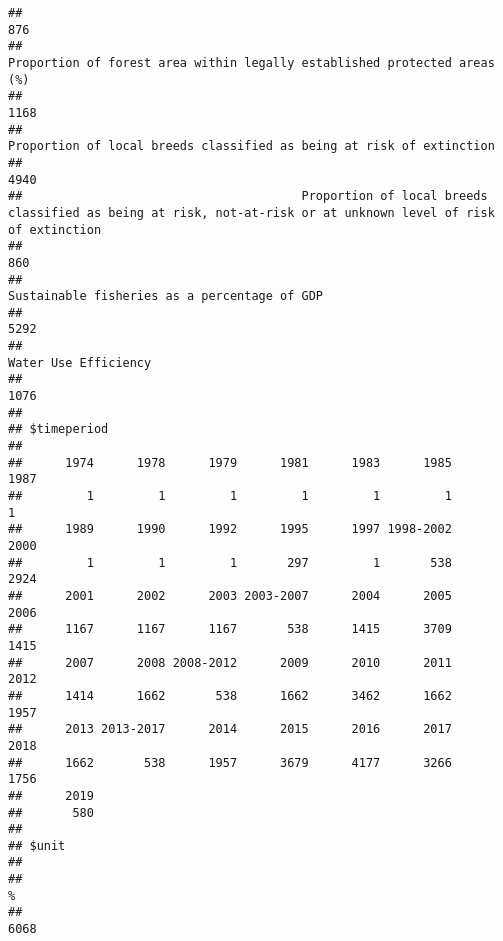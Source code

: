 \documentclass[]{article}
\begin{document}
\begin{verbatim}
##                                                                                                                                                 876 
##                                                                            Proportion of forest area within legally established protected areas (%) 
##                                                                                                                                                1168 
##                                                                                Proportion of local breeds classified as being at risk of extinction 
##                                                                                                                                                4940 
##                                       Proportion of local breeds classified as being at risk, not-at-risk or at unknown level of risk of extinction 
##                                                                                                                                                 860 
##                                                                                                        Sustainable fisheries as a percentage of GDP 
##                                                                                                                                                5292 
##                                                                                                                                Water Use Efficiency 
##                                                                                                                                                1076 
## 
## $timeperiod
## 
##      1974      1978      1979      1981      1983      1985      1987 
##         1         1         1         1         1         1         1 
##      1989      1990      1992      1995      1997 1998-2002      2000 
##         1         1         1       297         1       538      2924 
##      2001      2002      2003 2003-2007      2004      2005      2006 
##      1167      1167      1167       538      1415      3709      1415 
##      2007      2008 2008-2012      2009      2010      2011      2012 
##      1414      1662       538      1662      3462      1662      1957 
##      2013 2013-2017      2014      2015      2016      2017      2018 
##      1662       538      1957      3679      4177      3266      1756 
##      2019 
##       580 
## 
## $unit
## 
##                                                                                          % 
##                                                                                       6068 

\end{verbatim}
\end{document}

